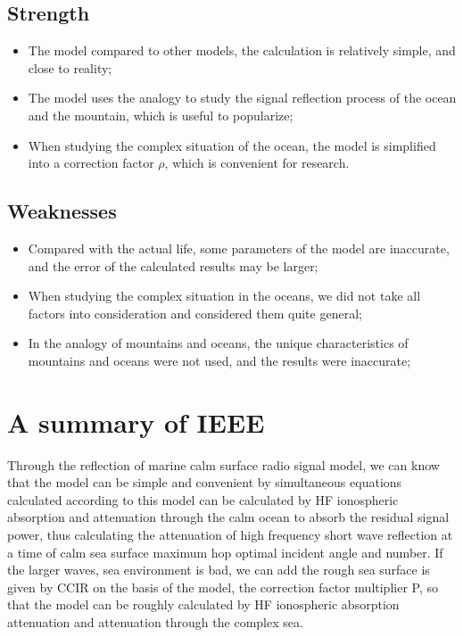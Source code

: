 \documentclass{mcmthesis}
\begin{document}
\subsection{Strength}
\begin{itemize}
  \item The model compared to other models, the calculation is relatively simple, and close to reality;
  \item The model uses the analogy to study the signal reflection process of the ocean and the mountain, which is useful to popularize;
  \item When studying the complex situation of the ocean, the model is simplified into a correction factor  $\rho$, which is convenient for research.
\end{itemize}

\subsection{Weaknesses}
\begin{itemize}
  \item Compared with the actual life, some parameters of the model are inaccurate, and the error of the calculated results may be larger;
  \item When studying the complex situation in the oceans, we did not take all factors into consideration and considered them quite general;
  \item In the analogy of mountains and oceans, the unique characteristics of mountains and oceans were not used, and the results were inaccurate;
\end{itemize}



\clearpage



\section{A summary of IEEE}
Through the reflection of marine calm surface radio signal model, we can know that the model can be simple and convenient by simultaneous equations calculated according to this model can be calculated by HF ionospheric absorption and attenuation through the calm ocean to absorb the residual signal power, thus calculating the attenuation of high frequency short wave reflection at a time of calm sea surface maximum hop optimal incident angle and number. If the larger waves, sea environment is bad, we can add the rough sea surface is given by CCIR on the basis of the model, the correction factor multiplier P, so that the model can be roughly calculated by HF ionospheric absorption attenuation and attenuation through the complex sea.
\end{document}
